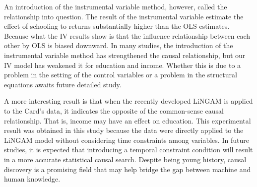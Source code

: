 \documentclass{article}\usepackage[]{graphicx}\usepackage[]{xcolor}
\begin{document}
An introduction of the instrumental variable method, however, called the relationship into question. 
The result of the instrumental variable estimate the effect of schooling to returns substantially higher than the OLS estimates.
Because what the IV results show is that the influence relationship between each other by OLS is biased downward. 
In many studies, the introduction of the instrumental variable method has strengthened the causal relationship,
but our IV model has weakened it for education and income. 
Whether this is due to a problem in the setting of the control variables or a problem in the structural equations awaits future detailed study.

A more interesting result is that when the recently developed LiNGAM is applied to the Card's data, 
it indicates the opposite of the common-sense causal relationship.
That is, income may have an effect on education.
This experimental result was obtained in this study because the data were directly applied to the LiNGAM model without considering time constraints among variables. 
In future studies, it is expected that introducing a temporal constraint condition will result in a more accurate statistical causal search.
Despite being young history, causal discovery is a promising field that may help bridge the gap between machine and human knowledge.
\end{document}
